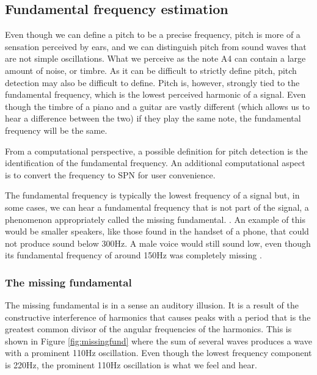 % 
\subsection{Fundamental frequency estimation}
Even though we can define a pitch to be a precise frequency, pitch is more of a sensation perceived by ears, and we can distinguish pitch from sound waves that are not simple oscillations. What we perceive as the note A4 can contain a large amount of noise, or timbre. As it can be difficult to strictly define pitch, pitch detection may also be difficult to define. Pitch is, however, strongly tied to the fundamental frequency, which is the lowest perceived harmonic of a signal. Even though the timbre of a piano and a guitar are vastly different (which allows us to hear a difference between the two) if they play the same note, the fundamental frequency will be the same. 

From a computational perspective, a possible definition for pitch detection is the identification of the fundamental frequency. An additional computational aspect is to convert the frequency to SPN for user convenience. 

The fundamental frequency is typically the lowest frequency of a signal but, in some cases, we can hear a fundamental frequency that is not part of the signal, a phenomenon appropriately called the missing fundamental. \cite{Gotsopoulos}. An example of this would be smaller speakers, like those found in the handset of a phone, that could not produce sound below 300Hz. A male voice would still sound low, even though its fundamental frequency of around 150Hz was completely missing \cite{Mather2009}.

\subsubsection{The missing fundamental}
The missing fundamental is in a sense an auditory illusion. It is a result of the constructive interference of harmonics that causes peaks with a period that is the greatest common divisor of the angular frequencies of the harmonics. This is shown in Figure \ref{fig:missingfund} where the sum of several waves produces a wave with a prominent 110Hz oscillation. Even though the lowest frequency component is 220Hz, the prominent 110Hz oscillation is what we feel and hear.

